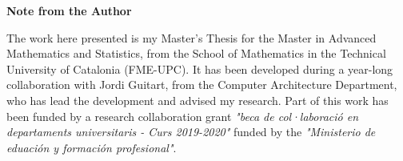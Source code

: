 \vspace*{4cm}
\Huge
\textbf{Note from the Author} \label{sec:acknowledgments}
\normalsize

\vspace{1cm}

The work here presented is my Master's Thesis for the Master in Advanced Mathematics and Statistics, from the School of Mathematics in the Technical University of Catalonia (FME-UPC).
It has been developed during a year-long collaboration with Jordi Guitart, from the Computer Architecture Department, who has lead the development and advised my research.
Part of this work has been funded by a research collaboration grant \textit{"beca de col·laboraci\'o en departaments universitaris - Curs 2019-2020"} funded by the \textit{"Ministerio de eduaci\'on y formaci\'on profesional"}.

%
%

\vspace*{\fill}
